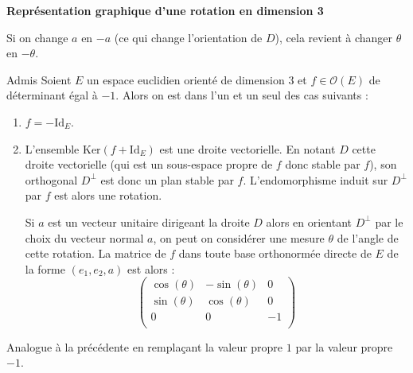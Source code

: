 \documentclass[french,11pt,twoside]{VcCours}
\begin{document}
\medskip

\begin{center}
\textbf{Représentation graphique d'une rotation en dimension 3}
\end{center}

\vspace{5cm}

%
%
%

\vspace{4cm}
\begin{Remarque}{} Si on change $a$ en $-a$ (ce qui change l'orientation de $D$), cela revient à changer $\theta$ en $- \theta$.
\end{Remarque}

\begin{Theoreme}{Admis} Soient $E$ un espace euclidien orienté de dimension $3$ et $f \in \mathcal{O}(E)$ de déterminant égal à $-1$. Alors on est dans l'un et un seul des cas suivants :
\begin{enumerate}
\item $f= -\textrm{Id}_E$.
\item L'ensemble $\textrm{Ker}(f +\textrm{Id}_E)$ est une droite vectorielle. En notant $D$ cette droite vectorielle (qui est un sous-espace propre de $f$ donc stable par $f$), son orthogonal $D^{\perp}$ est donc un plan stable par $f$. L'endomorphisme induit sur $D^{\perp}$ par $f$ est alors une rotation.

\medskip

Si $a$ est un vecteur unitaire dirigeant la droite $D$ alors en orientant $D^{\perp}$ par le choix du vecteur normal $a$, on peut on considérer une mesure $\theta$ de l'angle de cette rotation. La matrice de $f$ dans toute base orthonormée directe de $E$ de la forme $(e_1,e_2,a)$ est alors :
$$ \begin{pmatrix}
\cos(\theta) & -\sin(\theta) & 0 \\
\sin(\theta) & \cos(\theta) & 0 \\
0 & 0 &- 1 \\
\end{pmatrix}$$
\end{enumerate}
\end{Theoreme}

\begin{Demonstration}{} Analogue à la précédente en remplaçant la valeur propre $1$ par la valeur propre $-1$.
\end{Demonstration}
\end{document}
